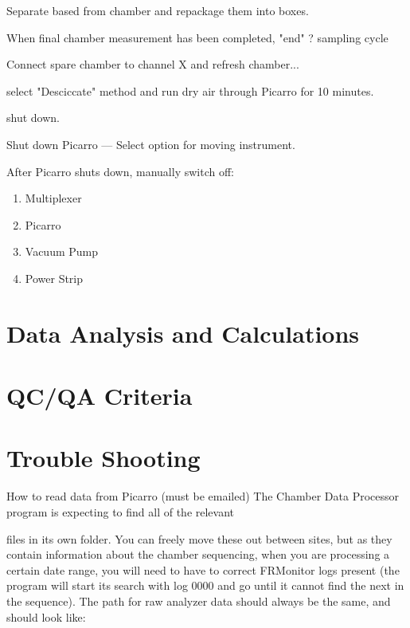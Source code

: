 \documentclass[12pt]{../SOP3}\usepackage[]{graphicx}\usepackage[]{color}
\begin{document}
\NP Separate based from chamber and repackage them into boxes.
                               
\NP When final chamber measurement has been completed, "end" ? sampling cycle
                               
\NP Connect spare chamber to channel X and refresh chamber... 
                               
\NP select "Desciccate" method and run dry air through Picarro for 10 minutes.
                               
\NP shut down.
                               
\NP Shut down Picarro --- Select option for moving instrument.
                               
\NP After Picarro shuts down, manually switch off:

\begin{enumerate}
  \item Multiplexer
  \item Picarro
  \item Vacuum Pump
  \item Power Strip
\end{enumerate}
                               
\section{Data Analysis and Calculations}


\section{QC/QA Criteria}


\section{Trouble Shooting}
How to read data from Picarro (must be emailed)
The Chamber Data Processor program is expecting to find all of the relevant 

files in its own folder. You can freely move these out between sites, but as they contain information about the chamber sequencing, when you are processing a certain date range, you will need to have to correct FRMonitor logs present (the program will start its search with log 0000 and go until it cannot find the next in the sequence). 
The path for raw analyzer data should always be the same, and should look like:  
\end{document}
